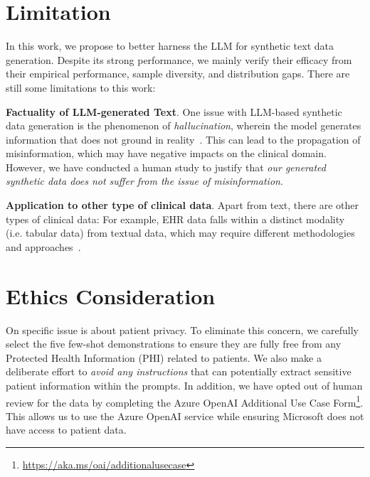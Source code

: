 \section*{Limitation}
In this work, we propose {\ours} to better harness the LLM for synthetic text data generation. 
Despite its strong performance, we mainly verify their efficacy from their empirical performance, sample diversity, and distribution gaps. There are still some limitations to this work:

\noindent \textbf{Factuality of LLM-generated Text}. One issue with LLM-based synthetic data generation is the phenomenon of \emph{hallucination}, wherein the model generates information that does not ground in reality~\citep{zhang2023siren}. This can lead to the propagation of misinformation, which may have negative impacts on the clinical domain. However, we have conducted a human study to justify that \emph{our generated synthetic data does not suffer from the issue of misinformation}.

\noindent \textbf{Application to other type of clinical data}.
Apart from text, there are other types of clinical data: 
For example, EHR data falls within a distinct modality (i.e. tabular data) from textual data, which may require different methodologies and approaches~\citep{wornow2023shaky}. 

\section*{Ethics Consideration}
On specific issue is about patient privacy. To eliminate this concern, we carefully select the five few-shot demonstrations to ensure they are fully free from any Protected Health Information (PHI) related to patients.  We also make a deliberate effort to \emph{avoid any instructions} that can potentially extract sensitive patient information within the prompts. 
In addition, we have opted out of human review for the data by completing the Azure OpenAI Additional Use Case Form\footnote{\url{https://aka.ms/oai/additionalusecase}}. This allows us to use the Azure OpenAI service while ensuring Microsoft does not have access to patient data.

\clearpage

